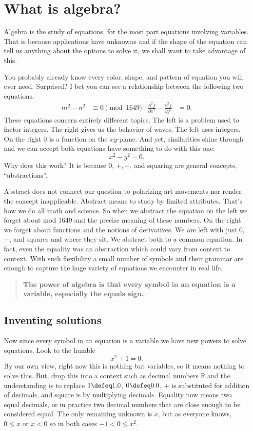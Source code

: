 \chapter{What is algebra?}

Algebra is the study of equations, for the most part equations involving variables.
That is because applications have unknowns and if 
the shape of the equation can tell us anything about the 
options to solve it, we shall want to take advantage of this.



You probably already know every color, shape, and pattern of 
equation you will ever need.  Surprised? I bet you 
can see a relationship between the following two equations.
\begin{align*}
    m^2-n^2 & \equiv 0 \pmod{1649} 
    & 
    \frac{\partial^2 f}{\partial x^2}-\frac{\partial^2 f}{\partial y^2} & =0.
\end{align*}
These equations concern entirely different topics.  The left is a problem 
used to factor integers.  The right gives us the behavior of waves.  
The left uses integers.  On the right $0$ is a function on the $xy$-plane.
And yet,  similarities shine through and we can accept both equations 
have something to do with this one:
\[
    x^2-y^2=0.
\]
Why does this work? It is because $0$, $+,-$, and squaring are general concepts,
``abstractions''.  

Abstract does not connect our question to polarizing art movements nor render
the concept inapplicable.  Abstract means to study by limited attributes.
That's how we do all math and science.  So when we abstract the equation on the
left we forget about mod 1649 and the precise meaning of these numbers.  On the
right we forget about functions and the notions of derivatives.  We are left
with just $0$, $-$, and squares and where they sit.  We abstract both to a
common equation. In fact, even the equality was an abstraction which could vary
from context to context. With such flexibility a small number of symbols and
their grammar are enough to capture the huge variety of equations we encounter
in real life.

\begin{quote}
    \textbf{The power of algebra is that every symbol 
    in an equation is a variable, especially the equals sign.}
\end{quote}

\section{Inventing solutions}
Now since every symbol in an equation is a variable we have new powers 
to solve equations.  Look to the humble 
\[
    x^2+1=0.
\]
By our own view, right now this is nothing but variables, so it means nothing to
solve this.  But, drop this into a context such as decimal numbers $\mathbb{R}$
and the understanding is to replace $1\defeq 1.0$, $0\defeq 0.0$, $+$ is
substituted for addition of decimals, and square is by multiplying decimals.
Equality now means two equal decimals, or in practice two decimal numbers that
are close enough to be considered equal.  The only remaining unknown is $x$, but
as everyone knows, $0\leq x$ or $x<0$ so in both cases $-1<0\leq x^2$.

